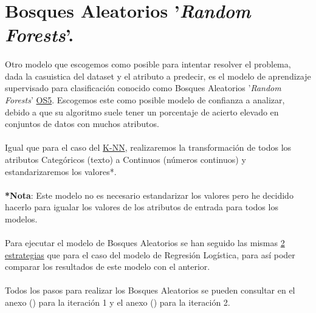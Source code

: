 \section{Bosques Aleatorios '\textit{Random Forests}'.}
\label{section:rf}

\paragraph{}
Otro modelo que escogemos como posible para intentar resolver el problema, dada la casuistica del dataset y el atributo a predecir, es el modelo de aprendizaje supervisado para clasificación conocido como Bosques Aleatorios '\textit{Random Forests}'\cite{ref:rf_def} \hyperref[os:OS5]{OS5}. Escogemos este como posible modelo de confianza a analizar, debido a que su algoritmo suele tener un porcentaje de acierto elevado en conjuntos de datos con muchos atributos.

\paragraph{}
Igual que para el caso del \hyperref[section:knn]{K-NN}, realizaremos la transformación de todos los atributos Categóricos (texto) a Continuos (números continuos) y estandarizaremos los valores*.

\paragraph{}
\textbf{*Nota}: Este modelo no es necesario estandarizar los valores pero he decidido hacerlo para igualar los valores de los atributos de entrada para todos los modelos.

\paragraph{}
Para ejecutar el modelo de Bosques Aleatorios se han seguido las mismas \hyperref[section:lr_casos]{2 estrategias} que para el caso del modelo de Regresión Logística, para así poder comparar los resultados de este modelo con el anterior.

\paragraph{}
Todos los pasos para realizar los Bosques Aleatorios se pueden consultar en el anexo () para la iteración 1 y el anexo () para la iteración 2.
